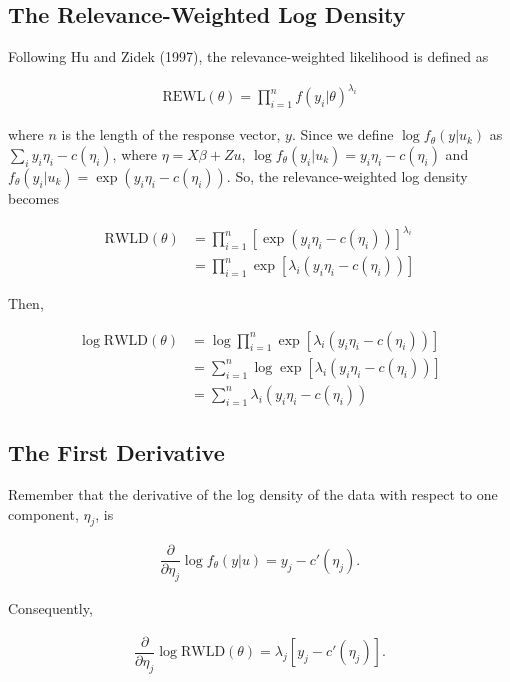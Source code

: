 \documentclass{article}
\begin{document}
\subsection{The Relevance-Weighted Log Density}
Following Hu and Zidek (1997), the relevance-weighted likelihood is defined as

\begin{align}
\text{REWL}(\theta) = \prod_{i=1}^n f(y_i | \theta)^{\lambda_i}
\end{align}

\noindent where $n$ is the length of the response vector, $y$. Since we define $\log f_\theta(y|u_k)$ as $\sum_i y_i\eta_i - c(\eta_i)$, where $\eta = X\beta + Zu$, $\log f_\theta(y_i | u_k) = y_i\eta_i - c(\eta_i)$ and $f_\theta(y_i|u_k) = \exp \left(  y_i\eta_i - c(\eta_i) \right)$. So, the relevance-weighted log density becomes

\begin{align}
\text{RWLD}(\theta) &= \prod_{i=1}^n \left[ \exp \left(  y_i\eta_i - c(\eta_i) \right) \right] ^{\lambda_i}  \\
&= \prod_{i=1}^n \exp \left[ \lambda_i \left(  y_i\eta_i - c(\eta_i) \right) \right]
\end{align}

\noindent Then,

\begin{align}
\log \text{RWLD}(\theta) &= \log \prod_{i=1}^n \exp \left[ \lambda_i \left(  y_i\eta_i - c(\eta_i) \right) \right] \\
&= \sum_{i=1}^n \log \exp \left[ \lambda_i \left(  y_i\eta_i - c(\eta_i) \right) \right] \\
&= \sum_{i=1}^n \lambda_i \left(  y_i\eta_i - c(\eta_i) \right)
\end{align}

\subsection{The First Derivative}

Remember that the derivative of the log density of the data with respect to one component, $\eta_j$, is 

\begin{align}
\dfrac{\partial}{\partial \eta_j} \log f_\theta (y|u) = y_j - c'(\eta_j).
\end{align}

\noindent Consequently, 

\begin{align}
\dfrac{\partial}{\partial \eta_j} \log \text{RWLD}(\theta) = \lambda_j \left[ y_j - c'(\eta_j) \right].
\end{align}
\end{document}
